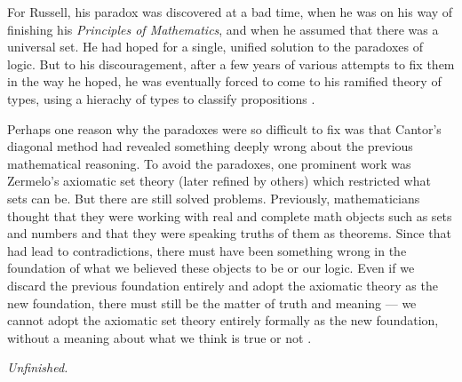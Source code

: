 \documentclass[10pt]{article}
\begin{document}
For Russell, his paradox was discovered at a bad time, when he was on his way
of finishing his \emph{Principles of Mathematics}, and when he assumed that
there was a universal set. He had hoped for a single, unified solution to the
paradoxes of logic. But to his discouragement, after a few years of various
attempts to fix them in the way he hoped, he was eventually forced to come to
his ramified theory of types, using a hierachy of types to classify
propositions \cite{companion.to.russell.tt}.

Perhaps one reason why the paradoxes were so difficult to fix was that Cantor's
diagonal method had revealed something deeply wrong about the previous
mathematical reasoning. To avoid the paradoxes, one prominent work was
Zermelo's axiomatic set theory (later refined by others) which restricted what
sets can be. But there are still solved problems. Previously, mathematicians
thought that they were working with real and complete math objects such as sets
and numbers and that they were speaking truths of them as theorems. Since that
had lead to contradictions, there must have been something wrong in the
foundation of what we believed these objects to be or our logic. Even if we
discard the previous foundation entirely and adopt the axiomatic theory as the
new foundation, there must still be the matter of truth and meaning --- we
cannot adopt the axiomatic set theory entirely formally as the new foundation,
without a meaning about what we think is true or not \cite[Ch.~12]{kleeneitmm}.

\emph{Unfinished.}





\end{document}
